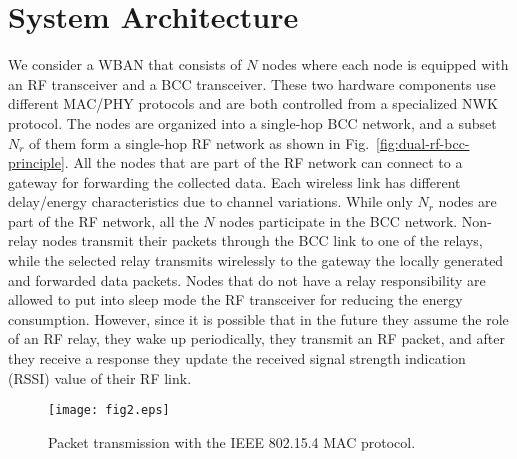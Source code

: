 \documentclass[10pt]{IEEEtran}
\newcounter{section:outage-analysis}
\begin{document}
\section{System Architecture}
\label{section:system-architecture}
We consider a WBAN that consists of $N$ nodes where each node is equipped with an RF transceiver and a BCC transceiver. These two hardware components use different MAC/PHY protocols and are both controlled from a specialized NWK protocol. The nodes are organized into a single-hop BCC network, and a subset $N_r$ of them form a single-hop RF network as shown in Fig.~\ref{fig:dual-rf-bcc-principle}. All the nodes that are part of the RF network can connect to a gateway for forwarding the collected data. Each wireless link has different delay/energy characteristics due to channel variations. While only $N_r$ nodes are part of the RF network, all the $N$ nodes participate in the BCC network. Non-relay nodes transmit their packets through the BCC link to one of the relays, while the selected relay transmits wirelessly to the gateway the locally generated and forwarded data packets. Nodes that do not have a relay responsibility are allowed to put into sleep mode the RF transceiver for reducing the energy consumption. However, since it is possible that in the future they assume the role of an RF relay, they wake up periodically, they transmit an RF packet, and after they receive a response they update the received signal strength indication (RSSI) value of their RF link.



\begin{figure}[t]
\begin{center}
  \texttt{[image: fig2.eps]}
  \caption{Packet transmission with the IEEE 802.15.4 MAC protocol.}
  \label{fig:rf-mac-protocol}
\end{center}
\end{figure}
\end{document}
